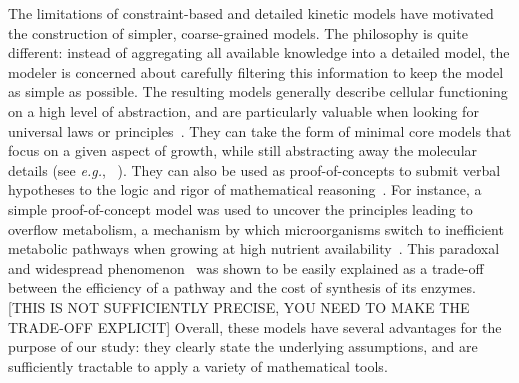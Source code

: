 The limitations of constraint-based and detailed kinetic models have motivated the construction of simpler, coarse-grained models.
The philosophy is quite different: instead of aggregating all available knowledge into a detailed model, the modeler is concerned about carefully filtering this information to keep the model as simple as possible.
The resulting models generally describe cellular functioning on a high level of abstraction, and are particularly valuable when looking for universal laws or principles~\cite{scott_bacterial_2011,scott_interdependence_2010,scott_emergence_2014}.
They can take the form of minimal core models that focus on a given aspect of growth, while still abstracting away the molecular details (see \textit{e.g.}, ~\cite{spiesser_size_2012}).
They can also be used as proof-of-concepts to submit verbal hypotheses to the logic and rigor of mathematical reasoning~\cite{servedio_not_2014}.
For instance, a simple proof-of-concept model was used to uncover the principles leading to overflow metabolism, a mechanism by which microorganisms switch to inefficient metabolic pathways when growing at high nutrient availability~\cite{molenaar_shifts_2009}.
This paradoxal and widespread phenomenon~\cite{dijken_kinetics_1993,vemuri_overflow_2006,mckeehan_glycolysis_1982,hsu_cancer_2008} was shown to be easily explained as a trade-off between the efficiency of a pathway and the cost of synthesis of its enzymes. [THIS IS NOT SUFFICIENTLY PRECISE, YOU NEED TO MAKE THE TRADE-OFF EXPLICIT]
Overall, these models have several advantages for the purpose of our study: they clearly state the underlying assumptions, and are sufficiently tractable to apply a variety of mathematical tools.




